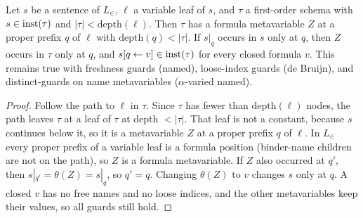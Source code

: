 \begin{lemma}\label{lem:zf:deepleaf}
Let $s$ be a sentence of $L_\in$, $\ell$ a variable leaf of $s$, and $\tau$ a first-order schema with
$s\in\mathrm{inst}(\tau)$ and $|\tau|<\mathrm{depth}(\ell)$. Then $\tau$ has a formula metavariable $Z$ at a proper prefix $q$
of $\ell$ with $\mathrm{depth}(q)<|\tau|$. If $s|_q$ occurs in $s$ only at $q$, then $Z$ occurs in $\tau$ only at $q$, and
$s[q\leftarrow v]\in\mathrm{inst}(\tau)$ for every closed formula $v$. This remains true with freshness guards (named),
loose-index guards (de Bruijn), and distinct-guards on name metavariables ($\alpha$-varied named).
\end{lemma}
\begin{proof}
Follow the path to $\ell$ in $\tau$. Since $\tau$ has fewer than $\mathrm{depth}(\ell)$ nodes, the path leaves $\tau$ at
a leaf of $\tau$ at depth $<|\tau|$. That leaf is not a constant, because $s$ continues below it, so it is a
metavariable $Z$ at a proper prefix $q$ of $\ell$. In $L_\in$ every proper prefix of a variable leaf is a formula
position (binder-name children are not on the path), so $Z$ is a formula metavariable. If $Z$ also occurred at $q'$,
then $s|_{q'}=\theta(Z)=s|_q$, so $q'=q$. Changing $\theta(Z)$ to $v$ changes $s$ only at $q$. A closed $v$ has no free
names and no loose indices, and the other metavariables keep their values, so all guards still hold.
\end{proof}

